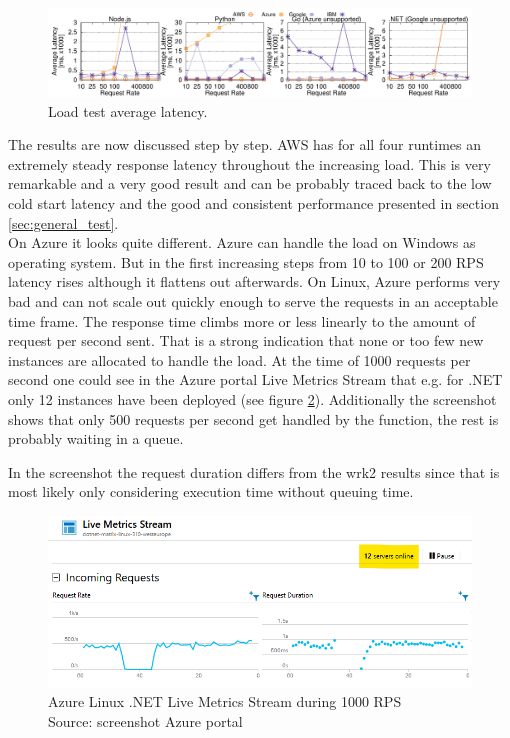 \begin{figure}[!t]
\centering
\includegraphics[scale=0.7]{bilder/loadtest_average_latency/tputlat_combined.pdf}
\caption{Load test average latency.}
\label{fig:load_test_latency_all}

\end{figure}
The results are now discussed step by step. \gls{AWS} has for all four runtimes an extremely steady response latency throughout the increasing load. This is very remarkable and a very good result and can be probably traced back to the low cold start latency and the good and consistent performance presented in section \ref{sec:general_test}.\\
On Azure it looks quite different. Azure can handle the load on Windows as operating system. But in the first increasing steps from 10 to 100 or 200 RPS latency rises although it flattens out afterwards. On Linux, Azure performs very bad and can not scale out quickly enough to serve the requests in an acceptable time frame. The response time climbs more or less linearly to the amount of request per second sent. That is a strong indication that none or too few new instances are allocated to handle the load. At the time of 1000 requests per second one could see in the Azure portal Live Metrics Stream that e.g. for .NET only 12 instances have been deployed (see figure \ref{fig:live_metrics_stream}). Additionally the screenshot shows that only 500 requests per second get handled by the function, the rest is probably waiting in a queue.
\begin{remark}
In the screenshot the request duration differs from the wrk2 results since that is most likely only considering execution time without queuing time.
\end{remark}

\begin{figure}[htp]
\centering
\includegraphics[scale=1.0]{bilder/Azure_Dotnet_1000.png}
\caption[Azure Linux .NET Live Metrics Stream during 1000 RPS]{Azure Linux .NET Live Metrics Stream during 1000 RPS\\Source: screenshot Azure portal}
\label{fig:live_metrics_stream}
\end{figure}

